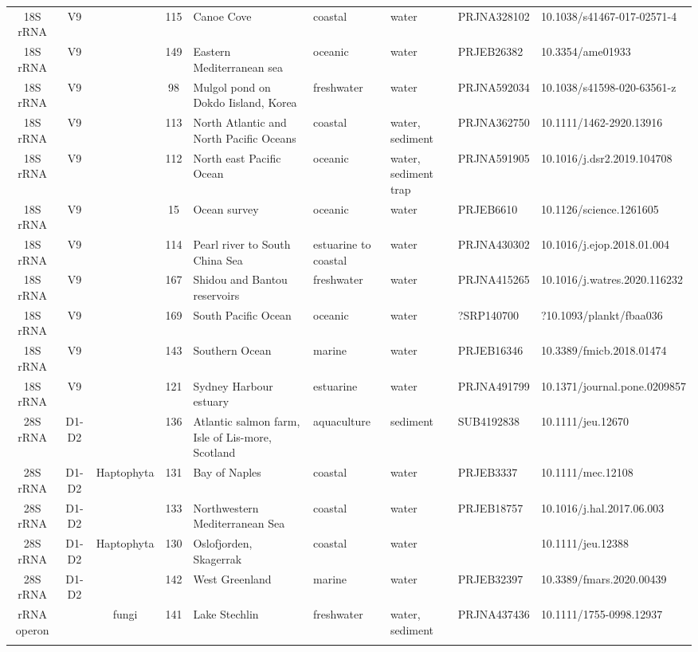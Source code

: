 \begin{longtable}{cccclllll}
  18S rRNA & V9 &  & 115 & Canoe Cove & coastal & water & PRJNA328102 & 10.1038/s41467-017-02571-4 \\ 
  18S rRNA & V9 &  & 149 & Eastern Mediterranean sea & oceanic & water & PRJEB26382 & 10.3354/ame01933 \\ 
  18S rRNA & V9 &  & 98 & Mulgol pond on Dokdo Iisland, Korea & freshwater & water & PRJNA592034 & 10.1038/s41598-020-63561-z \\ 
  18S rRNA & V9 &  & 113 & North Atlantic and North Pacific Oceans & coastal & water, sediment & PRJNA362750 & 10.1111/1462-2920.13916 \\ 
  18S rRNA & V9 &  & 112 & North east Pacific Ocean & oceanic & water, sediment trap & PRJNA591905 & 10.1016/j.dsr2.2019.104708 \\ 
  18S rRNA & V9 &  & 15 & Ocean survey & oceanic & water & PRJEB6610 & 10.1126/science.1261605 \\ 
  18S rRNA & V9 &  & 114 & Pearl river to South China Sea & estuarine to coastal & water & PRJNA430302 & 10.1016/j.ejop.2018.01.004 \\ 
  18S rRNA & V9 &  & 167 & Shidou and Bantou reservoirs & freshwater & water & PRJNA415265 & 10.1016/j.watres.2020.116232 \\ 
  18S rRNA & V9 &  & 169 & South Pacific Ocean & oceanic & water & ?SRP140700 & ?10.1093/plankt/fbaa036 \\ 
  18S rRNA & V9 &  & 143 & Southern Ocean & marine & water & PRJEB16346 & 10.3389/fmicb.2018.01474 \\ 
  18S rRNA & V9 &  & 121 & Sydney Harbour estuary & estuarine & water & PRJNA491799 & 10.1371/journal.pone.0209857 \\ 
  28S rRNA & D1-D2 &  & 136 & Atlantic salmon farm, Isle of Lis-more, Scotland & aquaculture & sediment & SUB4192838 & 10.1111/jeu.12670 \\ 
  28S rRNA & D1-D2 & Haptophyta & 131 & Bay of Naples & coastal & water & PRJEB3337 & 10.1111/mec.12108 \\ 
  28S rRNA & D1-D2 &  & 133 & Northwestern Mediterranean Sea & coastal & water & PRJEB18757 & 10.1016/j.hal.2017.06.003 \\ 
  28S rRNA & D1-D2 & Haptophyta & 130 & Oslofjorden, Skagerrak & coastal & water &  & 10.1111/jeu.12388 \\ 
  28S rRNA & D1-D2 &  & 142 & West Greenland & marine & water & PRJEB32397 & 10.3389/fmars.2020.00439 \\ 
  rRNA operon &  & fungi & 141 & Lake Stechlin & freshwater & water, sediment & PRJNA437436 & 10.1111/1755-0998.12937 \\ 
   \hline
\hline
\label{tabsup:datasets}
\end{longtable}
